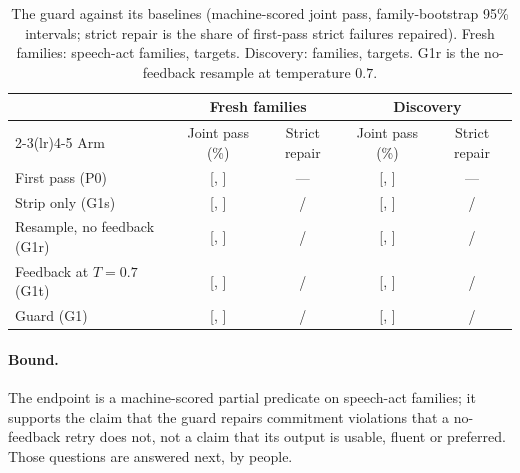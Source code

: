 \begin{table}[t]
\caption{The guard against its baselines (machine-scored joint pass, family-bootstrap 95\% intervals; strict repair is the share of first-pass strict failures repaired). Fresh families: \jmgbWcFamilies{} speech-act families, \jmgbWcTargets{} targets. Discovery: \jmgbDiscFamilies{} families, \jmgbDiscTargets{} targets. G1r is the no-feedback resample at temperature $0.7$.}\label{tab:guard}
\small
\begin{tabular}{lcccc}
\toprule
 & \multicolumn{2}{c}{Fresh families} & \multicolumn{2}{c}{Discovery} \\
\cmidrule(lr){2-3}\cmidrule(lr){4-5}
Arm & Joint pass (\%) & Strict repair & Joint pass (\%) & Strict repair \\
\midrule
First pass (P0) & \jmgbWcPZero{} [\jmgbWcPZeroLo{}, \jmgbWcPZeroHi{}] & --- & \jmgbDiscPZero{} [\jmgbDiscPZeroLo{}, \jmgbDiscPZeroHi{}] & --- \\
Strip only (G1s) & \jmgbWcGOnes{} [\jmgbWcGOnesLo{}, \jmgbWcGOnesHi{}] & \jmgbWcRepairGOnesK{}/\jmgbWcRepairGOnesN{} & \jmgbDiscGOnes{} [\jmgbDiscGOnesLo{}, \jmgbDiscGOnesHi{}] & \jmgbDiscRepairGOnesK{}/\jmgbDiscRepairGOnesN{} \\
Resample, no feedback (G1r) & \jmgbWcGOner{} [\jmgbWcGOnerLo{}, \jmgbWcGOnerHi{}] & \jmgbWcRepairGOnerK{}/\jmgbWcRepairGOnerN{} & \jmgbDiscGOner{} [\jmgbDiscGOnerLo{}, \jmgbDiscGOnerHi{}] & \jmgbDiscRepairGOnerK{}/\jmgbDiscRepairGOnerN{} \\
Feedback at $T=0.7$ (G1t) & \jmgbWcGOnet{} [\jmgbWcGOnetLo{}, \jmgbWcGOnetHi{}] & \jmgbWcRepairGOnetK{}/\jmgbWcRepairGOnetN{} & \jmgbDiscGOnet{} [\jmgbDiscGOnetLo{}, \jmgbDiscGOnetHi{}] & \jmgbDiscRepairGOnetK{}/\jmgbDiscRepairGOnetN{} \\
Guard (G1) & \jmgbWcGOne{} [\jmgbWcGOneLo{}, \jmgbWcGOneHi{}] & \jmgbWcRepairGOneK{}/\jmgbWcRepairGOneN{} & \jmgbDiscGOne{} [\jmgbDiscGOneLo{}, \jmgbDiscGOneHi{}] & \jmgbDiscRepairGOneK{}/\jmgbDiscRepairGOneN{} \\
\bottomrule
\end{tabular}
\end{table}

\paragraph{Bound.}
The endpoint is a machine-scored partial predicate on speech-act families; it supports the claim that the guard repairs commitment violations that a no-feedback retry does not, not a claim that its output is usable, fluent or preferred. Those questions are answered next, by people.

